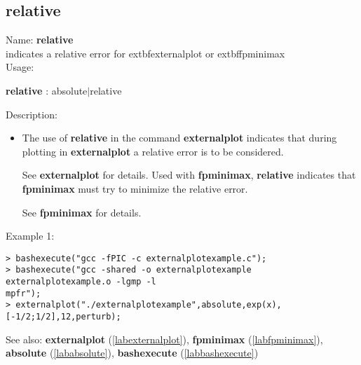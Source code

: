 \subsection{relative}
\label{labrelative}
\noindent Name: \textbf{relative}\\
indicates a relative error for 	extbf{externalplot} or 	extbf{fpminimax}\\
\noindent Usage: 
\begin{center}
\textbf{relative} : \textsf{absolute$|$relative}
\end{center}
\noindent Description: \begin{itemize}

\item The use of \textbf{relative} in the command \textbf{externalplot} indicates that during
   plotting in \textbf{externalplot} a relative error is to be considered.
    
   See \textbf{externalplot} for details.
   Used with \textbf{fpminimax}, \textbf{relative} indicates that \textbf{fpminimax} must try to minimize
   the relative error.
    
   See \textbf{fpminimax} for details.
\end{itemize}
\noindent Example 1: 
\begin{center}\begin{minipage}{15cm}\begin{Verbatim}[frame=single]
> bashexecute("gcc -fPIC -c externalplotexample.c");
> bashexecute("gcc -shared -o externalplotexample externalplotexample.o -lgmp -l
mpfr");
> externalplot("./externalplotexample",absolute,exp(x),[-1/2;1/2],12,perturb);
\end{Verbatim}
\end{minipage}\end{center}
See also: \textbf{externalplot} (\ref{labexternalplot}), \textbf{fpminimax} (\ref{labfpminimax}), \textbf{absolute} (\ref{lababsolute}), \textbf{bashexecute} (\ref{labbashexecute})
